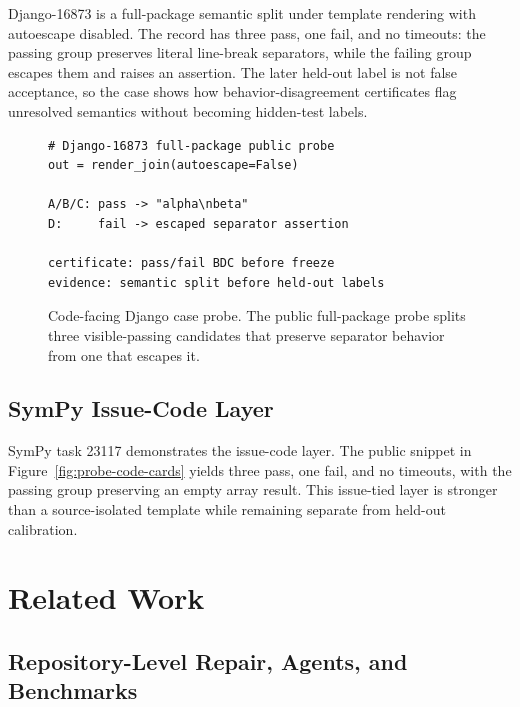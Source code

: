 \documentclass[conference]{IEEEtran}
\newcommand{\bdcs}{behavior-disagreement certificates\xspace}
\newcommand{\Description}[1]{}
\begin{document}
Django-16873 is a full-package semantic split under template rendering with autoescape disabled.
The record has three pass, one fail, and no timeouts: the passing group preserves literal line-break separators, while the failing group escapes them and raises an assertion.
The later held-out label is not false acceptance, so the case shows how \bdcs flag unresolved semantics without becoming hidden-test labels.

\begin{figure}[t]
\begin{lstlisting}[style=patchcourtpatch]
# Django-16873 full-package public probe
out = render_join(autoescape=False)

A/B/C: pass -> "alpha\nbeta"
D:     fail -> escaped separator assertion

certificate: pass/fail BDC before freeze
evidence: semantic split before held-out labels
\end{lstlisting}
  \caption{Code-facing Django case probe. The public full-package probe splits three visible-passing candidates that preserve separator behavior from one that escapes it.}
  \Description{A compact code-like Django probe card showing render_join with autoescape disabled, three passing candidates preserving alpha newline beta, one failing candidate with an escaped separator assertion, and an evidence note that the semantic split is recorded before held-out labels.}
  \label{fig:django-code-card}
\end{figure}

\subsection{SymPy Issue-Code Layer}

SymPy task 23117 demonstrates the issue-code layer.
The public snippet in Figure~\ref{fig:probe-code-cards} yields three pass, one fail, and no timeouts, with the passing group preserving an empty array result.
This issue-tied layer is stronger than a source-isolated template while remaining separate from held-out calibration.

\section{Related Work}

\subsection{Repository-Level Repair, Agents, and Benchmarks}
\end{document}
